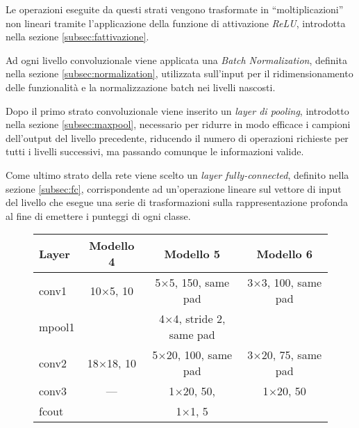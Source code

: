 Le operazioni eseguite da questi strati vengono trasformate in ``moltiplicazioni'' non lineari tramite l'applicazione della funzione di attivazione \emph{ReLU}, introdotta nella sezione \ref{subsec:fattivazione}.

Ad ogni livello convoluzionale viene applicata una \emph{Batch Normalization}, definita nella sezione \ref{subsec:normalization}, utilizzata sull'input per il ridimensionamento delle funzionalità e la normalizzazione batch nei livelli nascosti.

Dopo il primo strato convoluzionale viene inserito un \emph{layer di pooling}, introdotto nella sezione \ref{subsec:maxpool}, necessario per ridurre in modo efficace i campioni dell'output del livello precedente, riducendo il numero di operazioni richieste per tutti i livelli successivi, ma passando comunque le informazioni valide.

Come ultimo strato della rete viene scelto un \emph{layer fully-connected}, definito nella sezione \ref{subsec:fc}, corrispondente ad un'operazione lineare sul vettore di input del livello che esegue una serie di trasformazioni sulla rappresentazione profonda al fine di emettere i punteggi di ogni classe.

\begin{figure}[H]
	\centering
	\begin{tabular}{lccc}
		\toprule
		\textbf{Layer}& \textbf{Modello 4} & \textbf{Modello 5} & \textbf{Modello 6} 		\\ 
		\midrule
		conv1 	& \num{10}$\times$\num{5}, 10	  & \num{5}$\times$\num{5}, 150, same pad    &\num{3}$\times$\num{3}, 100, same pad 		   \\
		
		mpool1 	& &{\num{4}$\times$\num{4}, stride 2, same pad}	&   \\
		conv2  	& \num{18}$\times$\num{18}, 10	  &  \num{5}$\times$\num{20}, 100, same pad	  &		\num{3}$\times$\num{20}, 75, same pad    \\
		conv3  	& ---	  & \num{1}$\times$\num{20}, 50, 	   &	\num{1}$\times$\num{20}, 50 	   \\
		fcout		& &{\num{1}$\times$\num{1}, 5}&		   \\
		
		\bottomrule	
	\end{tabular}
	\label{tab:netemb1}
\end{figure}

